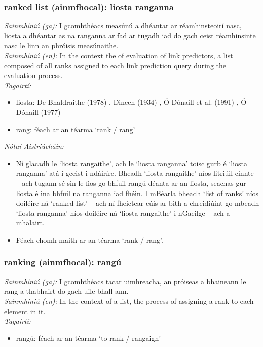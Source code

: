\subsubsection*{ranked list (ainmfhocal): liosta ranganna}
 \noindent \textit{Sainmhíniú (ga):} I gcomhthéacs measúnú a dhéantar ar réamhinsteoirí nasc, liosta a dhéantar as na ranganna ar fad ar tugadh iad do gach ceist réamhinsinte nasc le linn an phróisis measúnaithe.
\\
 \noindent \textit{Sainmhíniú (en):} In the context the of evaluation of link predictors, a list composed of all ranks assigned to each link prediction query during the evaluation process.
\\
 \noindent \textit{Tagairtí:}
\begin{itemize}
	\item liosta: De Bhaldraithe (1978) \cite{de-bhaldraithe}, Dineen (1934) \cite{dineen}, Ó Dónaill et al. (1991) \cite{focloir-beag}, Ó Dónaill (1977) \cite{odonaill}
	\item rang: féach ar an téarma `rank / rang'
\end{itemize}

 \noindent \textit{Nótaí Aistriúcháin:}
\begin{itemize}
	\item Ní glacadh le `liosta rangaithe', ach le `liosta ranganna' toisc gurb é `liosta ranganna' atá i gceist i ndáiríre. Bheadh `liosta rangaithe' níos litriúil cinnte -- ach tugann sé sin le fios go bhfuil rangú déanta ar an liosta, seachas gur liosta é ina bhfuil na ranganna iad fhéin. I mBéarla  bheadh `list of ranks' níos doiléire ná `ranked list' -- ach ní fheictear cúis ar bith a chreidiúint go mbeadh `liosta ranganna' níos doiléire ná `liosta rangaithe' i nGaeilge -- ach a mhalairt.
	\item Féach chomh maith ar an téarma `rank / rang'.
\end{itemize}


\subsubsection*{ranking (ainmfhocal): rangú}
 \noindent \textit{Sainmhíniú (ga):} I gcomhthéacs tacar uimhreacha, an próiseas a bhaineann le rang a thabhairt do gach uile bhall ann.
\\
 \noindent \textit{Sainmhíniú (en):} In the context of a list, the process of assigning a rank to each element in it.
\\
 \noindent \textit{Tagairtí:}
\begin{itemize}
	\item rangú: féach ar an téarma `to rank / rangaigh'
\end{itemize}

